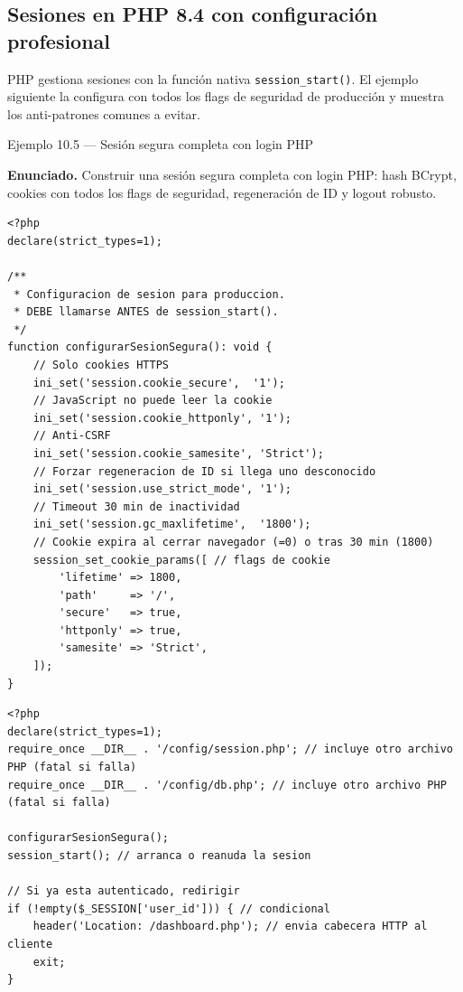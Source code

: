 \subsection{Sesiones en PHP 8.4 con configuración profesional}

PHP gestiona sesiones con la función nativa
\texttt{session\_start()}. El ejemplo siguiente la configura con todos
los flags de seguridad de producción y muestra los anti-patrones
comunes a evitar.


\begin{cajaejemplo}{Ejemplo 10.5 --- Sesión segura completa con login PHP}

\textbf{Enunciado.} Construir una sesión segura completa con login PHP: hash BCrypt, cookies con todos los flags de seguridad, regeneración de ID y logout robusto.

\begin{lstlisting}[style=php,caption={config/session.php (incluir antes de session\_start)},label=lst:10.11]
<?php
declare(strict_types=1);

/**
 * Configuracion de sesion para produccion.
 * DEBE llamarse ANTES de session_start().
 */
function configurarSesionSegura(): void {
    // Solo cookies HTTPS
    ini_set('session.cookie_secure',  '1');
    // JavaScript no puede leer la cookie
    ini_set('session.cookie_httponly', '1');
    // Anti-CSRF
    ini_set('session.cookie_samesite', 'Strict');
    // Forzar regeneracion de ID si llega uno desconocido
    ini_set('session.use_strict_mode', '1');
    // Timeout 30 min de inactividad
    ini_set('session.gc_maxlifetime',  '1800');
    // Cookie expira al cerrar navegador (=0) o tras 30 min (1800)
    session_set_cookie_params([ // flags de cookie
        'lifetime' => 1800,
        'path'     => '/',
        'secure'   => true,
        'httponly' => true,
        'samesite' => 'Strict',
    ]);
}
\end{lstlisting}

\begin{lstlisting}[style=php,caption={login.php con todas las prácticas},label=lst:10.12]
<?php
declare(strict_types=1);
require_once __DIR__ . '/config/session.php'; // incluye otro archivo PHP (fatal si falla)
require_once __DIR__ . '/config/db.php'; // incluye otro archivo PHP (fatal si falla)

configurarSesionSegura();
session_start(); // arranca o reanuda la sesion

// Si ya esta autenticado, redirigir
if (!empty($_SESSION['user_id'])) { // condicional
    header('Location: /dashboard.php'); // envia cabecera HTTP al cliente
    exit;
}


\end{lstlisting}
\end{cajaejemplo}
